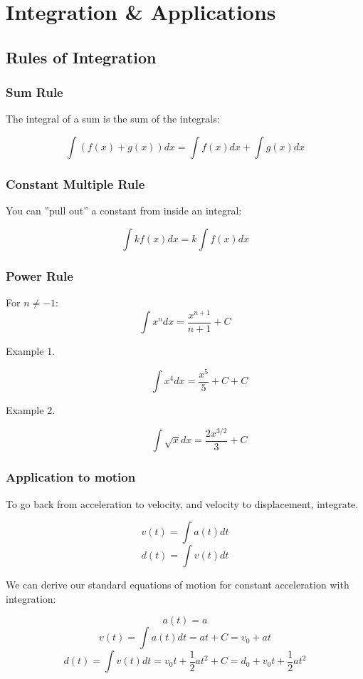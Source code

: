 \chapter{Integration \& Applications}

\section{Rules of Integration}

\subsection{Sum Rule}
The integral of a sum is the sum of the integrals:

$$\int (f(x) + g(x))dx = \int f(x)dx + \int g(x)dx$$

\subsection{Constant Multiple Rule}
You can ''pull out'' a constant from inside an integral:

$$\int kf(x)dx = k \int f(x)dx$$

\subsection{Power Rule}
For $n \ne -1$:
$$\int x^n dx = \frac{x^{n + 1}}{n + 1} + C$$

\begin{description}
    \item[Example 1.]
    $$\int x^4dx = \frac{x^5}{5} + C + C$$
    
    \item[Example 2.]
    $$\int \sqrt{x}dx = \frac{2x^{3/2}}{3} + C$$
\end{description}

\subsection{Application to motion}

To go back from acceleration to velocity, and velocity
to displacement, integrate.

$$v(t) = \int a(t)dt$$
$$d(t) = \int v(t)dt$$

We can derive our standard equations of motion for constant
acceleration with integration:

$$a(t) = a$$
$$v(t) = \int a(t)dt = at + C = v_0 + at$$
$$d(t) = \int v(t)dt = v_0t + \frac{1}{2}at^2 + C =
d_0 + v_0t + \frac{1}{2}at^2$$
